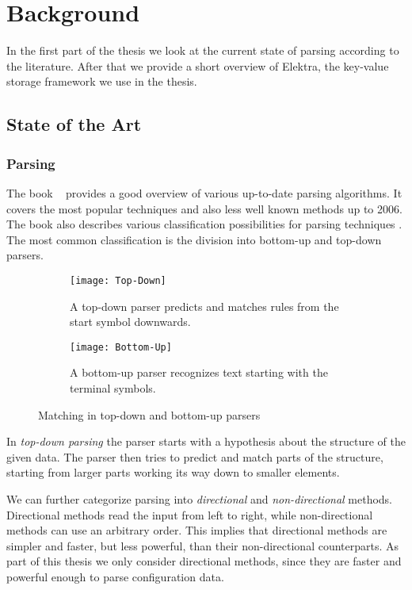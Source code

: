 \chapter{Background}

In the first part of the thesis we look at the current state of parsing according to the literature. After that we provide a short overview of Elektra, the key-value storage framework we use in the thesis.

\section{State of the Art}
\label{sec:state_of_the_art}

\subsection{Parsing}
\label{sec:parsing}

The book ~\cite{grune2008parsing} provides a good overview of various up-to-date parsing algorithms. It covers the most popular techniques and also less well known methods up to 2006. The book also describes various classification possibilities for parsing techniques \cite[p. 85]{grune2008parsing}. The most common classification is the division into bottom-up and top-down parsers.

\begin{figure}
  \centering
  \begin{subfigure}[t]{.48\textwidth}
    \texttt{[image: Top-Down]}
    \caption{A top-down parser predicts and matches rules from the start symbol downwards.}
  \end{subfigure}
  \quad
  \begin{subfigure}[t]{.48\textwidth}
    \texttt{[image: Bottom-Up]}
    \caption{A bottom-up parser recognizes text starting with the terminal symbols.}
  \end{subfigure}
  \caption{Matching in top-down and bottom-up parsers}
\end{figure}

In \emph{top-down parsing} the parser starts with a hypothesis about the structure of the given data. The parser then tries to predict and match parts of the structure, starting from larger parts working its way down to smaller elements.

We can further categorize parsing into \emph{directional} and \emph{non-directional} methods. Directional methods read the input from left to right, while non-directional methods can use an arbitrary order. This implies that directional methods are simpler and faster, but less powerful, than their non-directional counterparts. As part of this thesis we only consider directional methods, since they are faster and powerful enough to parse configuration data.

